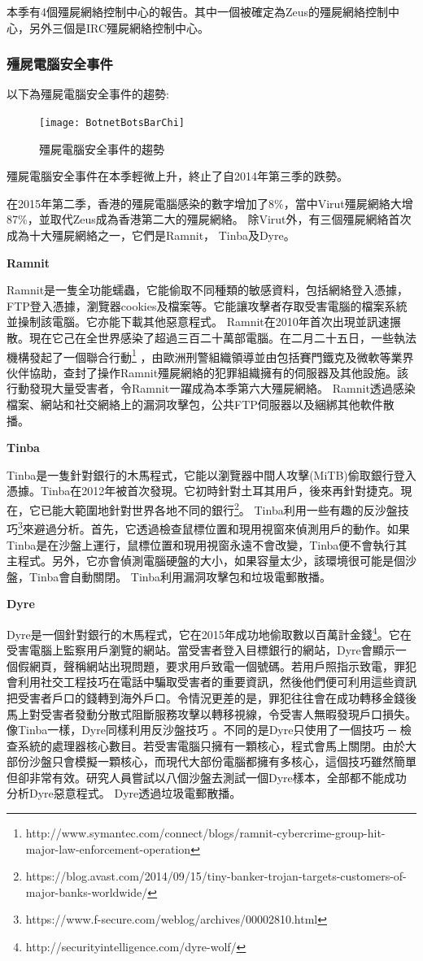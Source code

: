\documentclass[14pt]{extarticle}
\begin{document}
本季有4個殭屍網絡控制中心的報告。其中一個被確定為Zeus的殭屍網絡控制中心，另外三個是IRC殭屍網絡控制中心。

\subsubsection*{殭屍電腦安全事件}

以下為殭屍電腦安全事件的趨勢:
\begin{figure}[h!]
\centerline{\texttt{[image: BotnetBotsBarChi]}}
\caption{殭屍電腦安全事件的趨勢}
\end{figure}
\FloatBarrier
殭屍電腦安全事件在本季輕微上升，終止了自2014年第三季的跌勢。

在2015年第二季，香港的殭屍電腦感染的數字增加了8\%，當中Virut殭屍網絡大增87\%，並取代Zeus成為香港第二大的殭屍網絡。
除Virut外，有三個殭屍網絡首次成為十大殭屍網絡之一，它們是Ramnit， Tinba及Dyre。

\textbf{Ramnit} 

Ramnit是一隻全功能蠕蟲，它能偷取不同種類的敏感資料，包括網絡登入憑據，FTP登入憑據，瀏覽器cookies及檔案等。它能讓攻擊者存取受害電腦的檔案系統並操制該電腦。它亦能下載其他惡意程式。
Ramnit在2010年首次出現並訊速搌散。現在它己在全世界感染了超過三百二十萬部電腦。在二月二十五日，一些執法機構發起了一個聯合行動\footnote{http://www.symantec.com/connect/blogs/ramnit-cybercrime-group-hit-major-law-enforcement-operation} ，由歐洲刑警組織領導並由包括賽門鐵克及微軟等業界伙伴協助，查封了操作Ramnit殭屍網絡的犯罪組織擁有的伺服器及其他設施。該行動發現大量受害者，令Ramnit一躍成為本季第六大殭屍網絡。
Ramnit透過感染檔案、網站和社交網絡上的漏洞攻擊包，公共FTP伺服器以及綑綁其他軟件散播。

\textbf{Tinba} 

Tinba是一隻針對銀行的木馬程式，它能以瀏覽器中間人攻擊(MiTB)偷取銀行登入憑據。Tinba在2012年被首次發現。它初時針對土耳其用戶，後來再針對捷克。現在，它已能大範圍地針對世界各地不同的銀行\footnote{https://blog.avast.com/2014/09/15/tiny-banker-trojan-targets-customers-of-major-banks-worldwide/}。
Tinba利用一些有趣的反沙盤技巧\footnote{https://www.f-secure.com/weblog/archives/00002810.html}來避過分析。首先，它透過檢查鼠標位置和現用視窗來偵測用戶的動作。如果Tinba是在沙盤上運行，鼠標位置和現用視窗永遠不會改變，Tinba便不會執行其主程式。另外，它亦會偵測電腦硬盤的大小，如果容量太少，該環境很可能是個沙盤，Tinba會自動關閉。
Tinba利用漏洞攻擊包和垃圾電郵散播。


\textbf{Dyre} 

Dyre是一個針對銀行的木馬程式，它在2015年成功地偷取數以百萬計金錢\footnote{http://securityintelligence.com/dyre-wolf/ }。它在受害電腦上監察用戶瀏覽的網站。當受害者登入目標銀行的網站，Dyre會顯示一個假網頁，聲稱網站出現問題，要求用戶致電一個號碼。若用戶照指示致電，罪犯會利用社交工程技巧在電話中騙取受害者的重要資訊，然後他們便可利用這些資訊把受害者戶口的錢轉到海外戶口。令情況更差的是，罪犯往往會在成功轉移金錢後馬上對受害者發動分散式阻斷服務攻擊以轉移視線，令受害人無暇發現戶口損失。
像Tinba一樣，Dyre同樣利用反沙盤技巧 。不同的是Dyre只使用了一個技巧 ─ 檢查系統的處理器核心數目。若受害電腦只擁有一顆核心，程式會馬上關閉。由於大部份沙盤只會模擬一顆核心，而現代大部份電腦都擁有多核心，這個技巧雖然簡單但卻非常有效。研究人員嘗試以八個沙盤去測試一個Dyre樣本，全部都不能成功分析Dyre惡意程式。
Dyre透過垃圾電郵散播。
 
\end{document}
